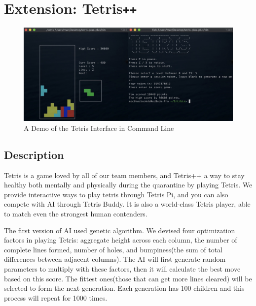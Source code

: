 \documentclass[11pt]{article}
\begin{document}

\section{Extension: Tetris\texttt{++}}

\begin{figure}[!ht]
  \centering
  \includegraphics[scale = 0.25]{tetris.jpg}
    \caption{A Demo of the Tetris Interface in Command Line}
  \label{part2:jpg}
\end{figure}



\subsection{Description}

\begin{flushleft}
Tetris is a game loved by all of our team members, and Tetris++ a way to stay healthy both mentally and physically during the quarantine by playing Tetris. We provide interactive ways to play tetris through Tetris Pi, and you can also compete with AI through Tetris Buddy. It is also a world-class Tetris player, able to match even the strongest human contenders.
\end{flushleft}

\begin{flushleft}
The first version of AI used genetic algorithm. We devised four optimization factors in playing Tetris: aggregate height across each column, the number of complete lines formed, number of holes, and bumpiness(the sum of total differences between adjacent columns). The AI will first generate random parameters to multiply with these factors, then it will calculate the best move based on this score. The fittest ones(those that can get more lines cleared) will be selected to form the next generation. Each generation has 100 children and this process will repeat for 1000 times.
\end{flushleft}
\end{document}
